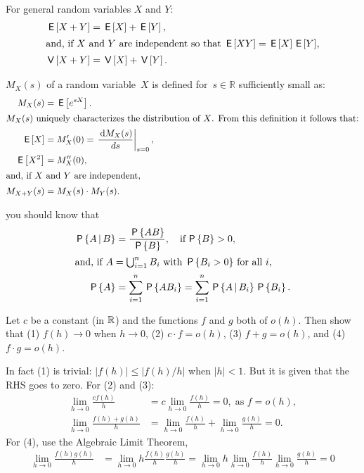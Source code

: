\documentclass[queueing_book]{subfiles}
\begin{document}
For general random variables $X$ and $Y$:
\begin{align}
  \,\mathsf{E}\left[X+Y\right] &= \,\mathsf{E}\left[X\right] + \,\mathsf{E}\left[Y\right], \label{eq:95}\\
\intertext{and, if $X$ and $Y$ are independent so that $\,\mathsf{E}\left[XY\right] = \,\mathsf{E}\left[X\right] \,\mathsf{E}\left[Y\right]$,}
  \,\mathsf{V}\left[X+Y\right] &= \,\mathsf{V}\left[X\right] + \,\mathsf{V}\left[Y\right]. \label{eq:94}
\end{align}

 $M_X(s)$ of a random variable~$X$ is defined for~$s\in \mathbb{R}$ sufficiently small as:
\begin{subequations}
\begin{align}
 M_X(s) &= \,\mathsf{E}\left[e^{s X}\right]. \label{eq:75}\\
\intertext{$M_X(s)$  uniquely characterizes the distribution of $X$. From this definition it follows that:}
 \,\mathsf{E}\left[X\right] &= M_{X}'(0) = \left.\frac{\,\textrm{d}M_{X}(s)}{d s}\right|_{s=0},\label{eq:69}\\
\,\mathsf{E}\left[X^2\right] &= M_{X}''(0), \label{eq:64}\\
\intertext{and, if $X$ and $Y$ are independent,}
M_{X+Y}(s) &= M_X(s)\cdot M_Y(s). \label{eq:73}
\end{align}
\end{subequations}


 you should know that
\begin{subequations}\label{eq:70} 
\begin{align}
\,\mathsf{P}\left\{A\,\middle|\, B\right\} & = \frac{\,\mathsf{P}\left\{AB\right\}}{\,\mathsf{P}\left\{B\right\}}, \quad\text{if}\, \,\mathsf{P}\left\{B\right\}>0, \\
\intertext{and, if $A=\bigcup_{i=1}^n B_i$ with $\,\mathsf{P}\left\{B_i>0\right\}$ for all $i$,}
 \,\mathsf{P}\left\{A\right\} &= \sum_{i=1}^n \,\mathsf{P}\left\{A B_i\right\} = \sum_{i=1}^n \,\mathsf{P}\left\{A\,\middle|\, B_i\right\} \,\mathsf{P}\left\{B_i\right\}.
\end{align}
\end{subequations}


\begin{exercise}\label{ex:l-104}
 Let $c$ be a constant (in $\mathbb{R}$) and the functions $f$ and $g$ both of $o(h)$. Then show that (1) $f(h) \to 0$ when $h\to 0$, (2) $c\cdot f = o(h)$, (3) $f+g=o(h)$, and (4) $f\cdot g=o(h)$. 
\begin{solution}
 In fact (1) is trivial: $|f(h)| \leq |f(h)/h|$ when $|h| < 1$.
 But it is given that the RHS goes to zero.
 For (2) and (3):
\begin{align*}
\lim_{h\to 0} \frac{c f(h)}{h} &= c \lim_{h\to 0} \frac{f(h)}{h} = 0, \; \text{as } f = o(h), \\
\lim_{h\to 0} \frac{f(h) + g(h)} h &= \lim_{h\to 0} \frac{f(h)} h + \lim_{h\to 0} \frac{g(h)} h = 0.
\end{align*}
For (4), use the Algebraic Limit Theorem,
\begin{align*}
\lim_{h\to 0} \frac{f(h)g(h)}{h} &= \lim_{h\to 0} h \frac{f(h)}{h} \frac{g(h)}{h} 
= \lim_{h\to 0} h \lim_{h\to 0} \frac{f(h)}{h} \lim_{h\to 0} \frac{g(h)}{h} = 0
\end{align*}
\end{solution}
\end{exercise}
\end{document}
